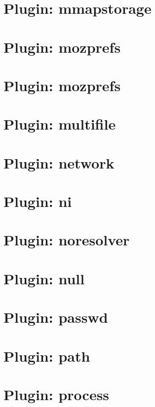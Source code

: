 \documentclass[twoside]{book}
\newcommand{\+}{\discretionary{\mbox{\scriptsize$\hookleftarrow$}}{}{}}
\begin{document}
\chapter{Plugin\+: mmapstorage}
\label{autotoc_md444}

\chapter{Plugin\+: mozprefs}
\label{autotoc_md466}

\chapter{Plugin\+: mozprefs}
\label{autotoc_md474}

\chapter{Plugin\+: multifile}
\label{autotoc_md481}

\chapter{Plugin\+: network}
\label{autotoc_md486}

\chapter{Plugin\+: ni}
\label{autotoc_md502}

\chapter{Plugin\+: noresolver}
\label{autotoc_md512}

\chapter{Plugin\+: null}
\label{autotoc_md513}

\chapter{Plugin\+: passwd}
\label{autotoc_md516}

\chapter{Plugin\+: path}
\label{autotoc_md522}

\chapter{Plugin\+: process}
\label{autotoc_md531}

\end{document}
